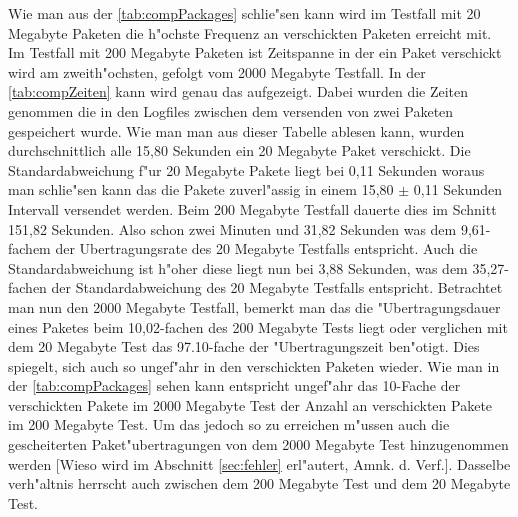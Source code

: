 Wie man aus der \cref{tab:compPackages} schlie"sen kann wird im Testfall mit 20 Megabyte Paketen %
die h"ochste Frequenz an verschickten Paketen erreicht mit. Im Testfall mit 200 Megabyte Paketen %
ist Zeitspanne in der ein Paket verschickt wird am zweith"ochsten, gefolgt vom 2000 Megabyte %
Testfall. In der \cref{tab:compZeiten} kann wird genau das aufgezeigt. Dabei wurden die Zeiten %
genommen die in den Logfiles zwischen dem versenden von zwei Paketen gespeichert wurde. Wie man man aus %
dieser Tabelle ablesen kann, wurden durchschnittlich alle 15,80 Sekunden ein 20 Megabyte %
Paket verschickt. Die Standardabweichung f"ur 20 Megabyte Pakete liegt bei 0,11 Sekunden %
woraus man schlie"sen kann das die Pakete zuverl"assig in einem 15,80 $\pm$ 0,11 Sekunden Intervall versendet %
werden. Beim 200 Megabyte Testfall dauerte dies im Schnitt 151,82 Sekunden. Also schon zwei Minuten und 31,82 Sekunden %
was dem 9,61-fachem der Ubertragungsrate des 20 Megabyte Testfalls entspricht. Auch die Standardabweichung ist h"oher %
diese liegt nun bei 3,88 Sekunden, was dem 35,27-fachen der Standardabweichung des 20 Megabyte Testfalls %
entspricht. Betrachtet man nun den 2000 Megabyte Testfall, bemerkt man das die "Ubertragungsdauer eines Paketes %
beim 10,02-fachen des 200 Megabyte Tests liegt oder verglichen mit dem 20 Megabyte Test das 97.10-fache der %
"Ubertragungszeit ben"otigt. Dies spiegelt, sich auch so ungef"ahr in den verschickten Paketen wieder. %
Wie man in der \cref{tab:compPackages} sehen kann entspricht ungef"ahr das 10-Fache der verschickten Pakete im %
2000 Megabyte Test der Anzahl an verschickten Pakete im 200 Megabyte Test. Um das jedoch so zu erreichen m"ussen %
auch die gescheiterten Paket"ubertragungen von dem 2000 Megabyte Test hinzugenommen werden [Wieso wird im Abschnitt %
\cref{sec:fehler} erl"autert, Amnk. d. Verf.]. Dasselbe verh"altnis herrscht auch zwischen dem 200 Megabyte Test und %
dem 20 Megabyte Test.  

